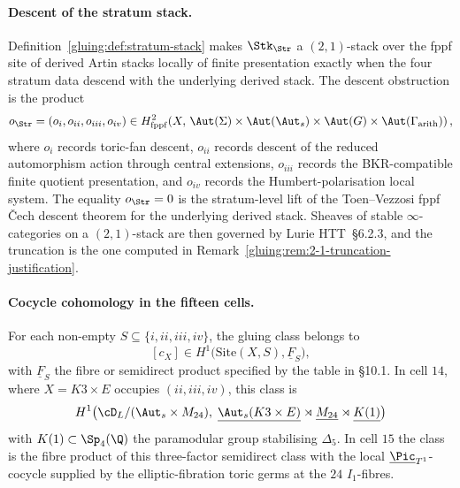 \paragraph{Descent of the stratum stack.}
Definition~\ref{gluing:def:stratum-stack} makes \(\Stk_{\Str}\) a
$(2,1)$-stack over the fppf site of derived Artin stacks locally of
finite presentation exactly when the four stratum data descend with the
underlying derived stack. The descent obstruction is the product
\[
 o_{\Str}=(o_i,o_{ii},o_{iii},o_{iv})
 \in
 H^2_{\mathrm{fppf}}\!\left(
 X,\,
 \Aut(\Sigma)\times\Aut(\Aut_s)\times\Aut(G)\times
 \Aut(\Gamma_{\mathrm{arith}})
 \right),
\]
where \(o_i\) records toric-fan descent, \(o_{ii}\) records descent of
the reduced automorphism action through central extensions,
\(o_{iii}\) records the BKR-compatible finite quotient presentation,
and \(o_{iv}\) records the Humbert-polarisation local system. The
equality \(o_{\Str}=0\) is the stratum-level lift of the
Toen--Vezzosi fppf \v{C}ech descent theorem for the underlying derived
stack. Sheaves of stable \(\infty\)-categories on a $(2,1)$-stack are
then governed by Lurie HTT~\S 6.2.3, and the truncation is the one
computed in Remark~\ref{gluing:rem:2-1-truncation-justification}.

\paragraph{Cocycle cohomology in the fifteen cells.} For each
non-empty \(S\subseteq\{i,ii,iii,iv\}\), the gluing class belongs to
\[
 [c_X]\in H^1\bigl(\mathrm{Site}(X,S),\underline F_S\bigr),
\]
with \(\underline F_S\) the fibre or semidirect product specified by
the table in \S 10.1. In cell \(14\), where
\(X=K3\times E\) occupies \((ii,iii,iv)\), this class is
\[
H^{1}\bigl(\cD_{L}/(\Aut_{s}\times M_{24}),\;
\underline{\Aut_{s}(K3\times E)}\rtimes\underline{M_{24}}\rtimes
\underline{K(1)}\bigr)
\]
with \(K(1)\subset\Sp_4(\Q)\) the paramodular group stabilising
\(\Delta_5\). In cell \(15\) the class is the fibre product of this
three-factor semidirect class with the local
\(\underline{\Pic}_{T^1}\)-cocycle supplied by the elliptic-fibration
toric germs at the \(24\) \(I_1\)-fibres.

